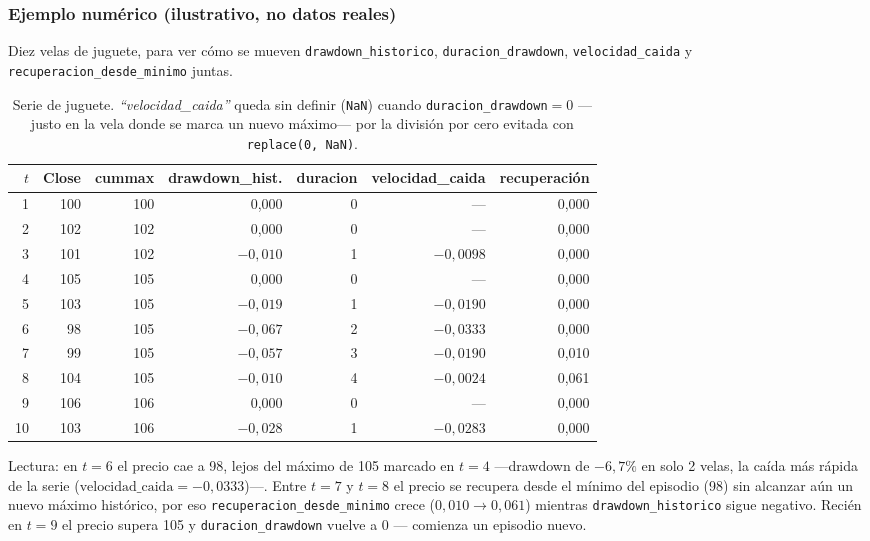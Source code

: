 \documentclass[11pt,a4paper]{article}
\newcommand{\code}[1]{\texttt{\small #1}}
\newcommand{\dq}[1]{\emph{``#1''}}
\begin{document}
\subsubsection*{Ejemplo numérico (ilustrativo, no datos reales)}

Diez velas de juguete, para ver cómo se mueven \code{drawdown\_historico},
\code{duracion\_drawdown}, \code{velocidad\_caida} y \code{recuperacion\_desde\_minimo}
juntas.

\begin{table}[h]
\centering
\small
\begin{tabular}{@{}r r r r r r r@{}}
\toprule
\(t\) & Close & cummax & drawdown\_hist. & duracion & velocidad\_caida & recuperación \\
\midrule
1  & 100 & 100 & 0{,}000  & 0 & — & 0{,}000 \\
2  & 102 & 102 & 0{,}000  & 0 & — & 0{,}000 \\
3  & 101 & 102 & \(-0{,}010\) & 1 & \(-0{,}0098\) & 0{,}000 \\
4  & 105 & 105 & 0{,}000  & 0 & — & 0{,}000 \\
5  & 103 & 105 & \(-0{,}019\) & 1 & \(-0{,}0190\) & 0{,}000 \\
6  & 98  & 105 & \(-0{,}067\) & 2 & \(-0{,}0333\) & 0{,}000 \\
7  & 99  & 105 & \(-0{,}057\) & 3 & \(-0{,}0190\) & 0{,}010 \\
8  & 104 & 105 & \(-0{,}010\) & 4 & \(-0{,}0024\) & 0{,}061 \\
9  & 106 & 106 & 0{,}000  & 0 & — & 0{,}000 \\
10 & 103 & 106 & \(-0{,}028\) & 1 & \(-0{,}0283\) & 0{,}000 \\
\bottomrule
\end{tabular}
\caption{Serie de juguete. \dq{velocidad\_caida} queda sin definir (\code{NaN}) cuando
\code{duracion\_drawdown}\(=0\) —justo en la vela donde se marca un nuevo máximo— por la
división por cero evitada con \code{replace(0, NaN)}.}
\end{table}

Lectura: en \(t{=}6\) el precio cae a 98, lejos del máximo de 105 marcado en \(t{=}4\)
—drawdown de \(-6{,}7\%\) en solo 2 velas, la caída más rápida de la serie
(\(\text{velocidad\_caida}=-0{,}0333\))—. Entre \(t{=}7\) y \(t{=}8\) el precio se recupera
desde el mínimo del episodio (98) sin alcanzar aún un nuevo máximo histórico, por eso
\code{recuperacion\_desde\_minimo} crece (\(0{,}010 \to 0{,}061\)) mientras
\code{drawdown\_historico} sigue negativo. Recién en \(t{=}9\) el precio supera 105 y
\code{duracion\_drawdown} vuelve a 0 — comienza un episodio nuevo.
\end{document}
